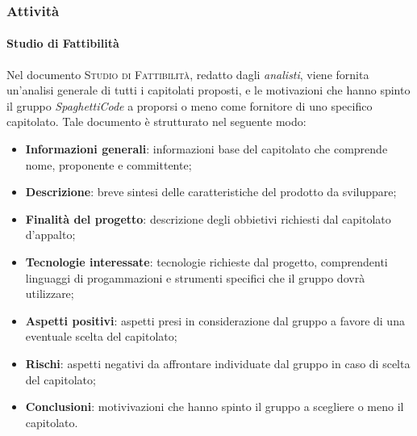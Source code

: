 \documentclass[../norme-di-progetto.tex]{subfiles}
\begin{document}
\subsubsection{Attività}
\paragraph{Studio di Fattibilità}
Nel documento \textsc{Studio di Fattibilità}, redatto dagli \emph{analisti}, viene fornita un'analisi generale di tutti i capitolati proposti, e le motivazioni che hanno spinto il gruppo \emph{SpaghettiCode} a proporsi o meno come fornitore di uno specifico capitolato. 
Tale documento è strutturato nel seguente modo:
\begin{itemize}
    \item \textbf{Informazioni generali}: informazioni base del capitolato che comprende nome, proponente e committente;
    \item \textbf{Descrizione}: breve sintesi delle caratteristiche del prodotto da sviluppare;
    \item \textbf{Finalità del progetto}: descrizione degli obbietivi richiesti dal capitolato d'appalto;
    \item \textbf{Tecnologie interessate}: tecnologie richieste dal progetto, comprendenti linguaggi di progammazioni e strumenti specifici che il gruppo dovrà utilizzare;
    \item \textbf{Aspetti positivi}: aspetti presi in considerazione dal gruppo a favore di una eventuale scelta del capitolato;
    \item \textbf{Rischi}: aspetti negativi da affrontare individuate dal gruppo in caso di scelta del capitolato;  
    \item \textbf{Conclusioni}: motivivazioni che hanno spinto il gruppo a scegliere o meno il capitolato.
\end{itemize}
\end{document}
